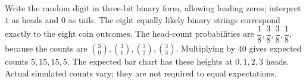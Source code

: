 Write the random digit in three-bit binary form, allowing leading zeros; interpret $1$ as heads and $0$ as tails. The eight equally likely binary strings correspond exactly to the eight coin outcomes. The head-count probabilities are $\dfrac{1}{8},\dfrac{3}{8},\dfrac{3}{8},\dfrac{1}{8}$, because the counts are $\binom30,\binom31,\binom32,\binom33$. Multiplying by $40$ gives expected counts $\boxed{5,15,15,5}$. The expected bar chart has these heights at $0,1,2,3$ heads. Actual simulated counts vary; they are not required to equal expectations.
